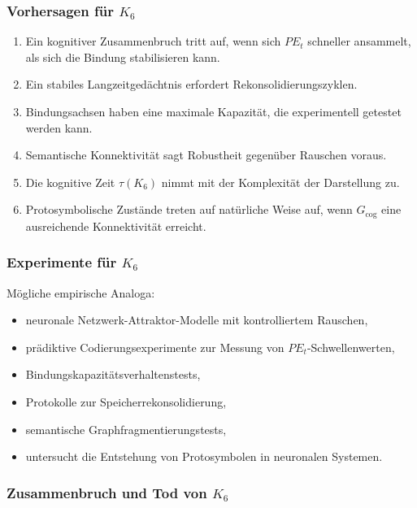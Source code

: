 \subsubsection{Vorhersagen für \texorpdfstring{$K_6$}{K_6}}

\begin{enumerate}
    \item Ein kognitiver Zusammenbruch tritt auf, wenn sich $PE_t$ schneller ansammelt, als sich die Bindung stabilisieren kann.
    \item Ein stabiles Langzeitgedächtnis erfordert Rekonsolidierungszyklen.
    \item Bindungsachsen haben eine maximale Kapazität, die experimentell getestet werden kann.
    \item Semantische Konnektivität sagt Robustheit gegenüber Rauschen voraus.
    \item Die kognitive Zeit $\tau(K_6)$ nimmt mit der Komplexität der Darstellung zu.
    \item Protosymbolische Zustände treten auf natürliche Weise auf, wenn $G_{\mathrm{cog}}$ eine ausreichende Konnektivität erreicht.
\end{enumerate}

\subsubsection{Experimente für \texorpdfstring{$K_6$}{K_6}}

Mögliche empirische Analoga:
\begin{itemize}
    \item neuronale Netzwerk-Attraktor-Modelle mit kontrolliertem Rauschen,
    \item prädiktive Codierungsexperimente zur Messung von $PE_t$-Schwellenwerten,
    \item Bindungskapazitätsverhaltenstests,
    \item Protokolle zur Speicherrekonsolidierung,
    \item semantische Graphfragmentierungstests,
    \item untersucht die Entstehung von Protosymbolen in neuronalen Systemen.
\end{itemize}

\subsubsection{Zusammenbruch und Tod von \texorpdfstring{$K_6$}{K_6}}

